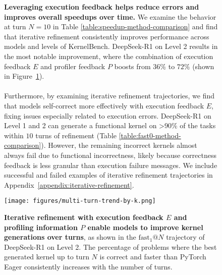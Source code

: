 \begin{figure}[ht]
    \centering
    \begin{minipage}{0.47\textwidth}
    \textbf{Leveraging execution feedback helps reduce errors and improves overall speedups over time.} We examine the  behavior at turn $N=10$ in Table \ref{table:speedup-method-comparison} and find that iterative refinement consistently improves performance across models and levels of KernelBench. DeepSeek-R1 on Level 2 results in the most notable improvement, where the combination of execution feedback $E$ and profiler feedback $P$ boosts  from $36\%$ to $72\%$ (shown in Figure~\ref{fig-multiturn-increase-k}). 
    \\\\
    Furthermore, by examining iterative refinement trajectories, we find that models self-correct more effectively with execution feedback $E$, fixing issues especially related to execution errors. DeepSeek-R1 on Level 1 and 2 can generate a functional kernel on \textgreater 90\% of the tasks within $10$ turns of refinement (Table \ref{table:fast0-method-comparison}). However, the remaining incorrect kernels almost always fail due to functional incorrectness, likely because correctness feedback is less granular than execution failure messages. We include successful and failed examples of iterative refinement trajectories in Appendix~\ref{appendix:iterative-refinement}. 
    
    \end{minipage}
    \hfill
    \begin{minipage}{0.49\textwidth}
        
       \centering
        \vspace{-2mm}
        \texttt{[image: figures/multi-turn-trend-by-k.png]} %
        \caption{\textbf{Iterative refinement with execution feedback $E$ and profiling information $P$ enable models to improve kernel generations over turns}, as shown in the $\text{fast}_{1}@N$ trajectory of DeepSeek-R1 on Level 2. The percentage of problems where the best generated kernel up to turn $N$ is correct and faster than PyTorch Eager consistently increases with the number of turns.}
        \vspace{-2mm}
        \label{fig-multiturn-increase-k}

    \end{minipage}
    
\end{figure}

